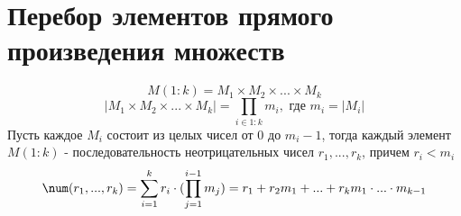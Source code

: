 \documentclass[discrete.tex]{subfiles}
\begin{document}
  \section{Перебор элементов прямого произведения множеств}
  
  \[M(1:k) = M_1 \times M_2 \times ... \times M_k\]
  \[|M_1 \times M_2 \times ... \times M_k| = \prod_{i \in 1:k} m_i, \text{ где }m_i = |M_i|\]
  Пусть каждое $M_i$ состоит из целых чисел от 0 до $m_i - 1$, тогда каждый элемент $M(1:k)$ - последовательность неотрицательных чисел $r_1,...,r_k$, причем $r_i < m_i$
  \[\num(r_1,...,r_k) = \sum^k_{i=1} r_i \cdot (\prod_{j=1}^{i-1} m_j) = r_1 + r_2 m_1 + ... + r_k m_1 \cdot ... \cdot m_{k-1}\]
\end{document}
